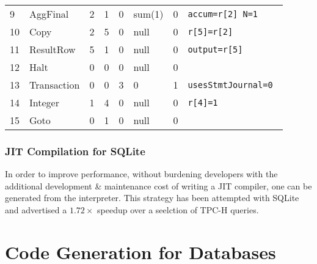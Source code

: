 \begin{center}
\begin{tabular}{l l | l l l l l | l}
        9             & AggFinal        & 2                                       & 1           & 0           & sum(1)          & 0           & \texttt{accum=r[2] N=1    }             \\
        10            & Copy            & 2                                       & 5           & 0           & null            & 0           & \texttt{r[5]=r[2]         }             \\
        11            & ResultRow       & 5                                       & 1           & 0           & null            & 0           & \texttt{output=r[5]       }             \\
        12            & Halt            & 0                                       & 0           & 0           & null            & 0           & \texttt{                  }             \\
        13            & Transaction     & 0                                       & 0           & 3           & 0               & 1           & \texttt{usesStmtJournal=0 }             \\
        14            & Integer         & 1                                       & 4           & 0           & null            & 0           & \texttt{r[4]=1            }             \\
        15            & Goto            & 0                                       & 1           & 0           & null            & 0           & \texttt{              }                 \\
    \end{tabular}
\end{center}

\subsubsection{JIT Compilation for SQLite}
In order to improve performance, without burdening developers with the additional development \& maintenance
cost of writing a JIT compiler, one can be generated from the interpreter. This strategy has been attempted with SQLite\cite{SQLiteJITCompiler} and advertised a $1.72\times$ speedup over a seelction of TPC-H queries.

\section{Code Generation for Databases}
